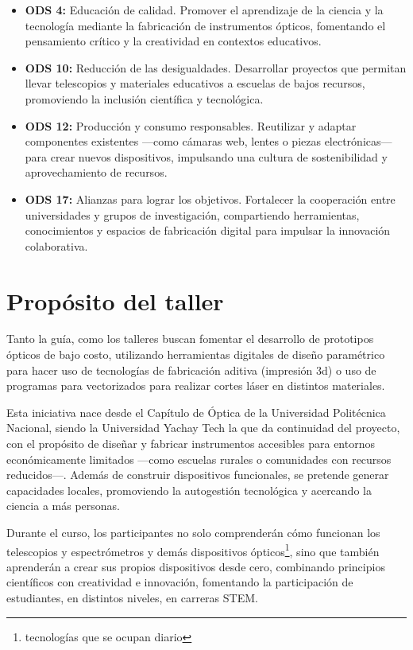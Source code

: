 \documentclass[12pt, twoside]{book}
\begin{document}
	\begin{itemize}
		\item \textbf{ODS 4:} Educación de calidad. Promover el aprendizaje de la ciencia y la tecnología mediante la fabricación de instrumentos ópticos, fomentando el pensamiento crítico y la creatividad en contextos educativos.
		\item \textbf{ODS 10:} Reducción de las desigualdades. Desarrollar proyectos que permitan llevar telescopios y materiales educativos a escuelas de bajos recursos, promoviendo la inclusión científica y tecnológica.
		\item \textbf{ODS 12:} Producción y consumo responsables. Reutilizar y adaptar componentes existentes —como cámaras web, lentes o piezas electrónicas— para crear nuevos dispositivos, impulsando una cultura de sostenibilidad y aprovechamiento de recursos.
		\item \textbf{ODS 17:} Alianzas para lograr los objetivos. Fortalecer la cooperación entre universidades y grupos de investigación, compartiendo herramientas, conocimientos y espacios de fabricación digital para impulsar la innovación colaborativa.
	\end{itemize}
	
	\section*{Propósito del taller}
	
	Tanto la guía, como los talleres buscan fomentar el desarrollo de prototipos ópticos de bajo costo, utilizando herramientas digitales de diseño paramétrico para hacer uso de tecnologías de fabricación aditiva (impresión 3d) o uso de programas para vectorizados para realizar cortes láser en distintos materiales.
	
	Esta iniciativa nace desde el Capítulo de Óptica de la Universidad Politécnica Nacional, siendo la Universidad Yachay Tech la que da continuidad del proyecto, con el propósito de diseñar y fabricar instrumentos accesibles para entornos económicamente limitados —como escuelas rurales o comunidades con recursos reducidos—.
	Además de construir dispositivos funcionales, se pretende generar capacidades locales, promoviendo la autogestión tecnológica y acercando la ciencia a más personas. 
	
	Durante el curso, los participantes no solo comprenderán cómo funcionan los telescopios y espectrómetros y demás dispositivos ópticos\footnote{tecnologías que se ocupan diario}, sino que también aprenderán a crear sus propios dispositivos desde cero, combinando principios científicos con creatividad e innovación, fomentando la participación de estudiantes, en distintos niveles, en carreras STEM.
	
\end{document}

